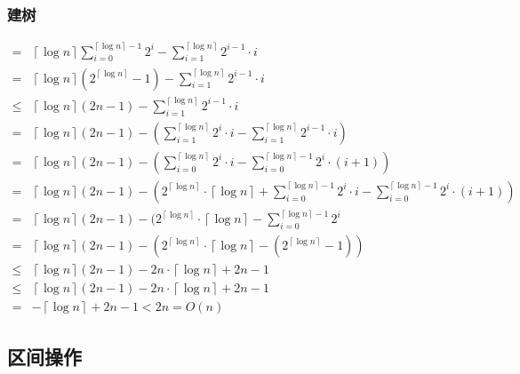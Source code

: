 \documentclass[utf8]{ctexbeamer}
\begin{document}
    \begin{frame}
        \frametitle{建树}
        \tiny
        \begin{align}
              =&\left\lceil\log n\right\rceil\sum_{i=0}^{\left\lceil\log n\right\rceil-1}2^i-\sum_{i=1}^{\left\lceil\log n\right\rceil}2^{i-1}\cdot i\nonumber\\
              =&\left\lceil\log n\right\rceil(2^{\left\lceil\log n\right\rceil}-1)-\sum_{i=1}^{\left\lceil\log n\right\rceil}2^{i-1}\cdot i\nonumber\\
            \le&\left\lceil\log n\right\rceil(2n-1)-\sum_{i=1}^{\left\lceil\log n\right\rceil}2^{i-1}\cdot i\nonumber\\
              =&\left\lceil\log n\right\rceil(2n-1)-(\sum_{i=1}^{\left\lceil\log n\right\rceil}2^{i}\cdot i-\sum_{i=1}^{\left\lceil\log n\right\rceil}2^{i-1}\cdot i)\nonumber\\
              =&\left\lceil\log n\right\rceil(2n-1)-(\sum_{i=0}^{\left\lceil\log n\right\rceil}2^{i}\cdot i-\sum_{i=0}^{\left\lceil\log n\right\rceil-1}2^i\cdot (i+1))\nonumber\\
              =&\left\lceil\log n\right\rceil(2n-1)-(2^{\left\lceil\log n\right\rceil}\cdot \left\lceil\log n\right\rceil+\sum_{i=0}^{\left\lceil\log n\right\rceil-1}2^{i}\cdot i-\sum_{i=0}^{\left\lceil\log n\right\rceil-1}2^i\cdot (i+1))\nonumber\\
              =&\left\lceil\log n\right\rceil(2n-1)-(2^{\left\lceil\log n\right\rceil}\cdot \left\lceil\log n\right\rceil-\sum_{i=0}^{\left\lceil\log n\right\rceil-1}2^{i}\nonumber\\
              =&\left\lceil\log n\right\rceil(2n-1)-(2^{\left\lceil\log n\right\rceil}\cdot \left\lceil\log n\right\rceil-(2^{\left\lceil\log n\right\rceil}-1))\nonumber\\
            \le&\left\lceil\log n\right\rceil(2n-1)-2n\cdot \left\lceil\log n\right\rceil+2n-1\nonumber\\
            \le&\left\lceil\log n\right\rceil(2n-1)-2n\cdot \left\lceil\log n\right\rceil+2n-1\nonumber\\
              =&-\left\lceil\log n\right\rceil+2n-1<2n=O(n)\nonumber
        \end{align}
    \end{frame}

    \subsection{区间操作}
\end{document}
